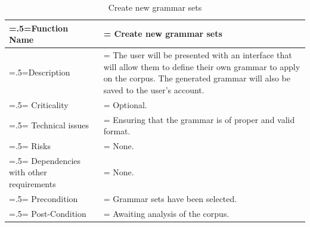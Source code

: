 \documentclass[12pt]{article}
\begin{document}
\begin{center}
    \begin{table}[H]
        \caption{Create new grammar sets}
        \begin{tabularx}{\textwidth} {
                | >{\raggedright\arraybackslash\hsize=.5\hsize\linewidth=\hsize}X
                | >{\raggedright\arraybackslash\hsize=1.5\hsize\linewidth=\hsize}X |}
            \hline
            Function Name                        & Create new grammar sets                                                                                                                                                               \\ \hline
            Description                          & The user will be presented with an interface that will allow them to define their own grammar to apply on the corpus. The generated grammar will also be saved to the user's account. \\ \hline
            Criticality                          & Optional.                                                                                                                                                                             \\ \hline
            Technical issues                     & Ensuring that the grammar is of proper and valid format.                                                                                                                              \\ \hline
            Risks                                & None.                                                                                                                                                                                 \\ \hline
            Dependencies with other requirements & None.                                                                                                                                                                                 \\ \hline
            Precondition                         & Grammar sets have been selected.                                                                                                                                                      \\ \hline
            Post-Condition                       & Awaiting analysis of the corpus.                                                                                                                                                      \\ \hline
        \end{tabularx}
    \end{table}
\end{center}
\end{document}
